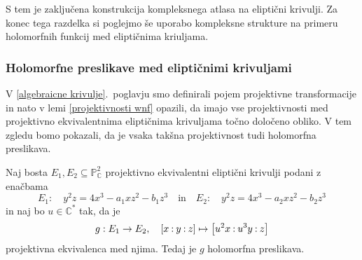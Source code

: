 \documentclass[mat1]{fmfdelo}
\numberwithin{equation}{section}
\newcommand{\C}{\mathbb C}
\newcommand{\CM}{\mathbb C ^*}
\newcommand{\PC}{\mathbb{P}^2_\C}
\newcommand{\pcoor}[1]{%
\begingroup\lccode`~=`: \lowercase{\endgroup
\edef~}{\mathbin{\mathchar\the\mathcode`:}\nobreak}%
\left[%
\begingroup
\mathcode`:=\string"8000
#1%
\endgroup
\right]%
}
\theoremstyle{definition}
\begin{document}
S tem je zaključena konstrukcija kompleksnega atlasa na eliptični krivulji. Za konec tega razdelka si poglejmo še uporabo kompleksne strukture na primeru holomorfnih funkcij med eliptičnima kriuljama.  

\subsubsection{Holomorfne preslikave med eliptičnimi krivuljami}
    V \ref{algebraicne krivulje}.\ poglavju smo definirali pojem projektivne transformacije in nato v lemi \ref{projektivnosti wnf} opazili, da imajo vse projektivnosti med projektivno ekvivalentnima eliptičnima krivuljama točno določeno obliko. V tem zgledu bomo pokazali, da je vsaka takšna projektivnost tudi holomorfna preslikava. 

\begin{trditev}
    \label{projektivnost je biholomorfizem}
    Naj bosta $E_1, E_2 \subseteq \PC$ projektivno ekvivalentni eliptični krivulji podani z enačbama 
    \[
        E_1 : \quad y^2z = 4x^3 - a_1xz^2 - b_1z^3 \quad \text {in} \quad
        E_2 : \quad y^2z = 4x^3 - a_2xz^2 - b_2z^3
    \]
    in naj bo $u \in \CM$ tak, da je
    \[
        g: E_1 \to E_2, \quad \pcoor{x : y : z} \mapsto \pcoor{u^2x : u^3y : z}  
    \]
    projektivna ekvivalenca med njima. Tedaj je $g$ holomorfna preslikava.  
\end{trditev}
\end{document}
